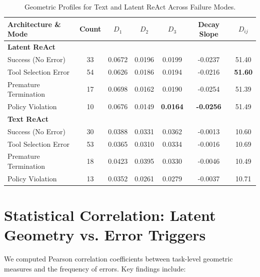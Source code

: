 \documentclass[a4paper, 12pt]{report}
\begin{document}
\begin{table}[h!]
\centering
\small
\caption{Geometric Profiles for Text and Latent ReAct Across Failure Modes.}
\label{tab:error_profiles}
\vspace{3pt}
\begin{tabular}{lcccccc}
\toprule
\textbf{Architecture \& Mode} & \textbf{Count} & \textbf{$D_1$} & \textbf{$D_2$} & \textbf{$D_3$} & \textbf{Decay Slope} & \textbf{$D_{ij}$} \\
\midrule
\textbf{Latent ReAct} & & & & & & \\
Success (No Error) & 33 & 0.0672 & 0.0196 & 0.0199 & -0.0237 & 51.40 \\
Tool Selection Error & 54 & 0.0626 & 0.0186 & 0.0194 & -0.0216 & \textbf{51.60} \\
Premature Termination & 17 & 0.0698 & 0.0162 & 0.0190 & -0.0254 & 51.39 \\
Policy Violation & 10 & 0.0676 & 0.0149 & \textbf{0.0164} & \textbf{-0.0256} & 51.49 \\
\midrule
\textbf{Text ReAct} & & & & & & \\
Success (No Error) & 30 & 0.0388 & 0.0331 & 0.0362 & -0.0013 & 10.60 \\
Tool Selection Error & 53 & 0.0365 & 0.0310 & 0.0334 & -0.0016 & 10.69 \\
Premature Termination & 18 & 0.0423 & 0.0395 & 0.0330 & -0.0046 & 10.49 \\
Policy Violation & 13 & 0.0352 & 0.0261 & 0.0279 & -0.0037 & 10.71 \\
\bottomrule
\end{tabular}
\end{table}

\section{Statistical Correlation: Latent Geometry vs. Error Triggers}
We computed Pearson correlation coefficients between task-level geometric measures and the frequency of errors. Key findings include:
\end{document}
